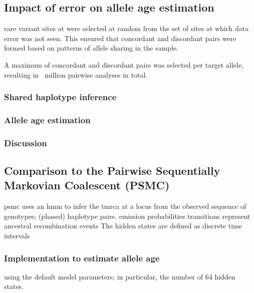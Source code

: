 %
\subsection{Impact of error on allele age estimation}
%


 rare variant sites at \fk{[2,50]} were selected at random from the set of sites at which data error was not seen.
This ensured that concordant and discordant pairs were formed based on patterns of allele sharing in the sample.

A maximum of  concordant and  discordant pairs was selected per target allele, resulting in ~million pairwise analyses in total.


%
\subsubsection{Shared haplotype inference}
%


%

%


%
\subsubsection{Allele age estimation}
%


%
\subsubsection{Discussion}
%




%
\subsection{Comparison to the Pairwise Sequentially Markovian Coalescent (PSMC)}
%


\Gls{psmc} uses an \gls{hmm} to infer the \gls{tmrca} at a locus from the observed sequence of genotypes; \ie (phased) haplotype pairs.
emission probabilities
transitions represent ancestral recombination events
The hidden states are defined as discrete time intervals



%
\subsubsection{Implementation to estimate allele age}
%


using the default model parameters; in particular, the number of 64 hidden states.

